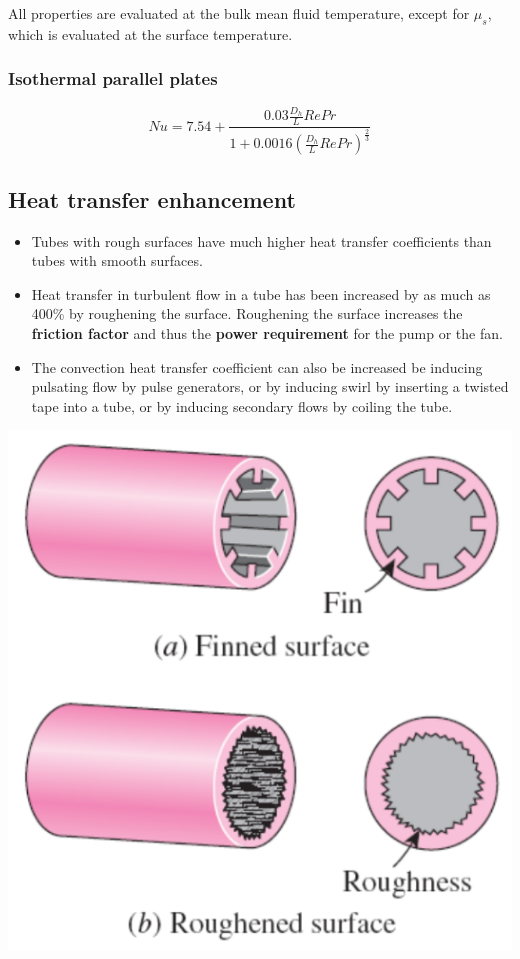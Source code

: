 \documentclass[11pt]{article}
\begin{document}
All properties are evaluated at the bulk mean fluid temperature, except for \(\mu_s\), which is evaluated at the surface temperature.
\subsubsection{Isothermal parallel plates}
\label{sec:org2a1a45f}
\[Nu = 7.54 + \frac{0.03 \frac{D_h}{L} Re Pr}{1 + 0.0016 \left(\frac{D_h}{L} Re Pr \right)^{\frac{2}{3}}}\]

 \newpage
\subsection{Heat transfer enhancement}
\label{sec:orgf8f4a68}
\begin{itemize}
\item Tubes with rough surfaces have much higher heat transfer coefficients than tubes with smooth surfaces.
\item Heat transfer in turbulent flow in a tube has been increased by as much as 400\% by roughening the surface. Roughening the surface increases the \textbf{friction factor} and thus the \textbf{power requirement} for the pump or the fan.
\item The convection heat transfer coefficient can also be increased be inducing pulsating flow by pulse generators, or by inducing swirl by inserting a twisted tape into a tube, or by inducing secondary flows by coiling the tube.
\end{itemize}

\begin{center}
\includegraphics[width=.9\linewidth]{./images/heat-transfer-enhancement-diagram.png}
\end{center}
\end{document}
